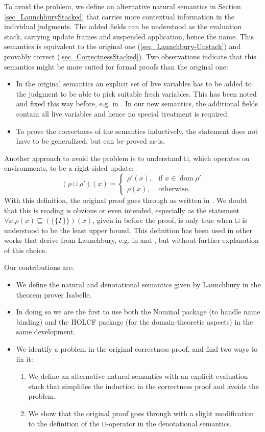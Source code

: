 \documentclass[11pt,a4paper,parskip=half]{scrartcl}
\begin{document}
To avoid the problem, we define an alternative natural semantics in Section \ref{sec_LaunchburyStacked} that carries more contextual information in the individual judgments. The added fields can be understood as the evaluation stack, carrying update frames and suspended application, hence the name. This semantics is equivalent to the original one (\ref{sec_Launchbury-Unstack}) and provably correct (\ref{sec_CorrectnessStacked}). Two observations indicate that this semantics might be more suited for formal proofs than the original one:
\begin{itemize}
\item In the original semantics an explicit set of live variables has to be added to the judgment to be able to pick suitable fresh variables. This has been noted and fixed this way before, e.g. in \cite{sestoft}. In our new semantics, the additional fields contain all live variables and hence no special treatment is required.
\item To prove the correctness of the semantics inductively, the statement does not have to be generalized, but can be proved as-is.
\end{itemize}

Another approach to avoid the problem is to understand $\sqcup$, which operates on environments, to be a right-sided update:
\[
(\rho \sqcup \rho')(x) = 
\begin{cases}
\rho'(x), &\text{if } x \in \operatorname{dom} \rho' \\
\rho(x), &\text{otherwise.}
\end{cases}
\]
With this definition, the original proof goes through as written in \cite{launchbury}. We doubt that this is reading is obvious or even intended, especially as the statement $\forall x. \rho(x) \sqsubseteq (\{\!\!\{\Gamma\}\!\!\})(x)$, given in \cite{launchbury} before the proof, is only true when $\sqcup$ is understood to be the least upper bound. This definition has been used in other works that derive from Launchbury, e.g. in \cite{parallel} and \cite{nakata_blackhole}, but without further explanation of this choice.

Our contributions are:
\begin{itemize}
\item We define the natural and denotational semantics given by Launchbury in the theorem prover Isabelle.
\item In doing so we are the first to use both the Nominal package (to handle name binding) \cite{nominal} and the HOLCF \cite{holcf} package (for the domain-theoretic aspects) in the same development.
\item We identify a problem in the original correctness proof, and find two ways to fix it:
\begin{enumerate}
\item We define an alternative natural semantics with an explicit evaluation stack that simplifies the induction in the correctness proof and avoids the problem.
\item We show that the original proof goes through with a slight modification to the definition of the $\sqcup$-operator in the denotational semantics.
\end{enumerate}
\end{itemize}
\end{document}
